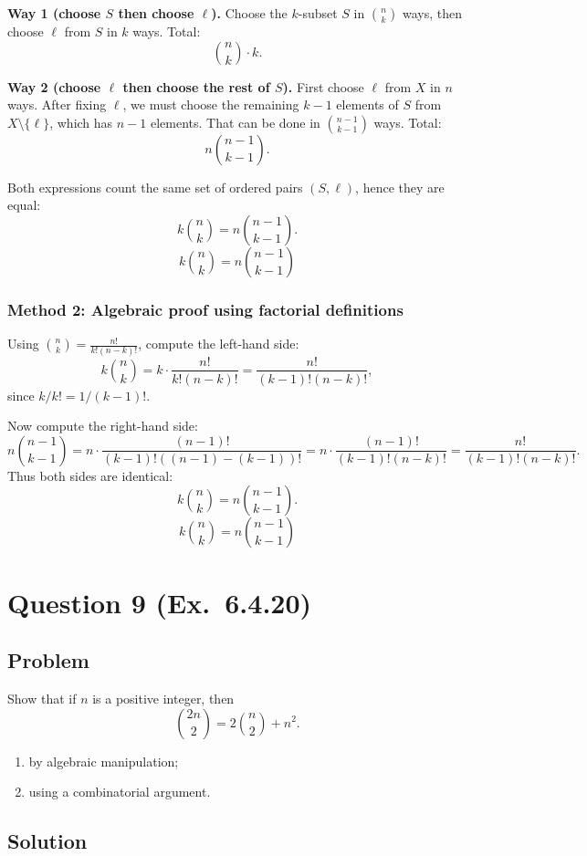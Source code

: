\documentclass[12pt]{article}
\begin{document}
\medskip
\noindent\textbf{Way 1 (choose $S$ then choose $\ell$).}
Choose the $k$-subset $S$ in $\binom{n}{k}$ ways, then choose $\ell$ from $S$ in $k$ ways. Total:
\[
\binom{n}{k}\cdot k.
\]

\medskip
\noindent\textbf{Way 2 (choose $\ell$ then choose the rest of $S$).}
First choose $\ell$ from $X$ in $n$ ways. After fixing $\ell$, we must choose the remaining $k-1$ elements of $S$ from $X\setminus\{\ell\}$, which has $n-1$ elements. That can be done in $\binom{n-1}{k-1}$ ways. Total:
\[
n\binom{n-1}{k-1}.
\]

Both expressions count the same set of ordered pairs $(S,\ell)$, hence they are equal:
\[
k\binom{n}{k}=n\binom{n-1}{k-1}.
\]
\[
\boxed{k\binom{n}{k}=n\binom{n-1}{k-1}}
\]

\subsubsection{Method 2: Algebraic proof using factorial definitions}
Using $\displaystyle \binom{n}{k}=\frac{n!}{k!(n-k)!}$, compute the left-hand side:
\[
k\binom{n}{k}
=k\cdot \frac{n!}{k!(n-k)!}
=\frac{n!}{(k-1)!(n-k)!},
\]
since $k/k!=1/(k-1)!$.

Now compute the right-hand side:
\[
n\binom{n-1}{k-1}
=n\cdot \frac{(n-1)!}{(k-1)!((n-1)-(k-1))!}
=n\cdot \frac{(n-1)!}{(k-1)!(n-k)!}
=\frac{n!}{(k-1)!(n-k)!}.
\]
Thus both sides are identical:
\[
k\binom{n}{k}=n\binom{n-1}{k-1}.
\]
\[
\boxed{k\binom{n}{k}=n\binom{n-1}{k-1}}
\]

\newpage

\section{Question 9 (Ex.\ 6.4.20)}
\subsection{Problem}
Show that if $n$ is a positive integer, then
\[
\binom{2n}{2}=2\binom{n}{2}+n^{2}.
\]
\begin{enumerate}[label=(\alph*)]
\item by algebraic manipulation;
\item using a combinatorial argument.
\end{enumerate}

\subsection{Solution}
\end{document}
